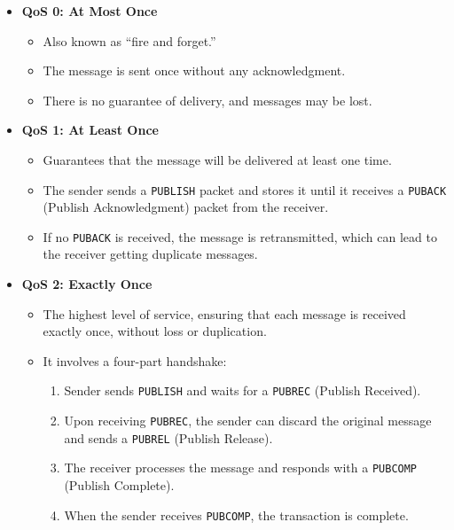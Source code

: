 \documentclass[a4paper, 12pt]{book} %
\begin{document}
\begin{itemize}
\tightlist
\item
  \textbf{QoS 0: At Most Once}

  \begin{itemize}
  \tightlist
  \item
    Also known as ``fire and forget.''
  \item
    The message is sent once without any acknowledgment.
  \item
    There is no guarantee of delivery, and messages may be lost.
  \end{itemize}
\item
  \textbf{QoS 1: At Least Once}

  \begin{itemize}
  \tightlist
  \item
    Guarantees that the message will be delivered at least one time.
  \item
    The sender sends a \texttt{PUBLISH} packet and stores it until it
    receives a \texttt{PUBACK} (Publish Acknowledgment) packet from the
    receiver.
  \item
    If no \texttt{PUBACK} is received, the message is retransmitted,
    which can lead to the receiver getting duplicate messages.
  \end{itemize}
\item
  \textbf{QoS 2: Exactly Once}

  \begin{itemize}
  \tightlist
  \item
    The highest level of service, ensuring that each message is received
    exactly once, without loss or duplication.
  \item
    It involves a four-part handshake:

    \begin{enumerate}
    \def\labelenumi{\arabic{enumi}.}
    \tightlist
    \item
      Sender sends \texttt{PUBLISH} and waits for a \texttt{PUBREC}
      (Publish Received).
    \item
      Upon receiving \texttt{PUBREC}, the sender can discard the
      original message and sends a \texttt{PUBREL} (Publish Release).
    \item
      The receiver processes the message and responds with a
      \texttt{PUBCOMP} (Publish Complete).
    \item
      When the sender receives \texttt{PUBCOMP}, the transaction is
      complete.
    \end{enumerate}
  \end{itemize}
\end{itemize}
\end{document}
